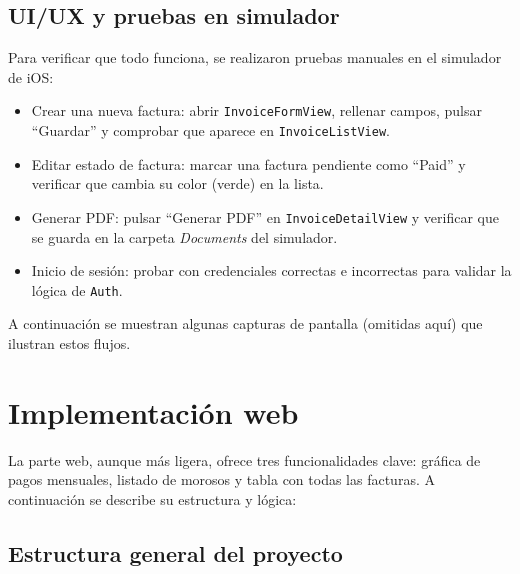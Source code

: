 \subsection{UI/UX y pruebas en simulador}

\begin{large}

Para verificar que todo funciona, se realizaron pruebas manuales en el simulador de iOS:

\begin{itemize}
  \item Crear una nueva factura: abrir \texttt{InvoiceFormView}, rellenar campos, pulsar “Guardar” y comprobar que aparece en \texttt{InvoiceListView}.
  \item Editar estado de factura: marcar una factura pendiente como “Paid” y verificar que cambia su color (verde) en la lista.
  \item Generar PDF: pulsar “Generar PDF” en \texttt{InvoiceDetailView} y verificar que se guarda en la carpeta \emph{Documents} del simulador.
  \item Inicio de sesión: probar con credenciales correctas e incorrectas para validar la lógica de \texttt{Auth}.
\end{itemize}

A continuación se muestran algunas capturas de pantalla (omitidas aquí) que ilustran estos flujos.

\end{large}

\section{Implementación web}

\begin{large}

La parte web, aunque más ligera, ofrece tres funcionalidades clave: gráfica de pagos mensuales, listado de morosos y tabla con todas las facturas. A continuación se describe su estructura y lógica:

\end{large}

\subsection{Estructura general del proyecto}

